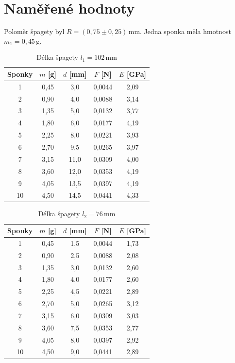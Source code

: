 \documentclass[a4paper,12pt]{article}
\begin{document}
\section{Naměřené hodnoty}
Poloměr špagety byl $R = (0,75 \pm 0,25)$\,mm. Jedna sponka měla hmotnost $m_1 = 0,45$\,g. 

\begin{table}[H]
\centering
\caption{Délka špagety $l_1 = 102$\,mm}
\vspace{2mm}
\renewcommand{\arraystretch}{1.5}
\begin{tabular}{|c|c|c|c|c|}
\hline
\textbf{Sponky} & \textbf{$m$ [g]} & \textbf{$d$ [mm]} & \textbf{$F$ [N]} & \textbf{$E$ [GPa]} \\
\hline \hline
1  & 0,45 & 3,0  & 0,0044 & 2,09 \\ \hline
2  & 0,90 & 4,0  & 0,0088 & 3,14 \\ \hline
3  & 1,35 & 5,0  & 0,0132 & 3,77 \\ \hline
4  & 1,80 & 6,0  & 0,0177 & 4,19 \\ \hline
5  & 2,25 & 8,0  & 0,0221 & 3,93 \\ \hline
6  & 2,70 & 9,5  & 0,0265 & 3,97 \\ \hline
7  & 3,15 & 11,0 & 0,0309 & 4,00 \\ \hline
8  & 3,60 & 12,0 & 0,0353 & 4,19 \\ \hline
9  & 4,05 & 13,5 & 0,0397 & 4,19 \\ \hline
10 & 4,50 & 14,5 & 0,0441 & 4,33 \\ \hline
\end{tabular}
\end{table}

\begin{table}[H]
\centering
\caption{Délka špagety $l_2 = 76$\,mm}
\vspace{2mm}
\renewcommand{\arraystretch}{1.5}
\begin{tabular}{|c|c|c|c|c|}
\hline
\textbf{Sponky} & \textbf{$m$ [g]} & \textbf{$d$ [mm]} & \textbf{$F$ [N]} & \textbf{$E$ [GPa]} \\
\hline \hline
1  & 0,45 & 1,5 & 0,0044 & 1,73 \\ \hline
2  & 0,90 & 2,5 & 0,0088 & 2,08 \\ \hline
3  & 1,35 & 3,0 & 0,0132 & 2,60 \\ \hline
4  & 1,80 & 4,0 & 0,0177 & 2,60 \\ \hline
5  & 2,25 & 4,5 & 0,0221 & 2,89 \\ \hline
6  & 2,70 & 5,0 & 0,0265 & 3,12 \\ \hline
7  & 3,15 & 6,0 & 0,0309 & 3,03 \\ \hline
8  & 3,60 & 7,5 & 0,0353 & 2,77 \\ \hline
9  & 4,05 & 8,0 & 0,0397 & 2,92 \\ \hline
10 & 4,50 & 9,0 & 0,0441 & 2,89 \\ \hline
\end{tabular}
\end{table}
\end{document}
